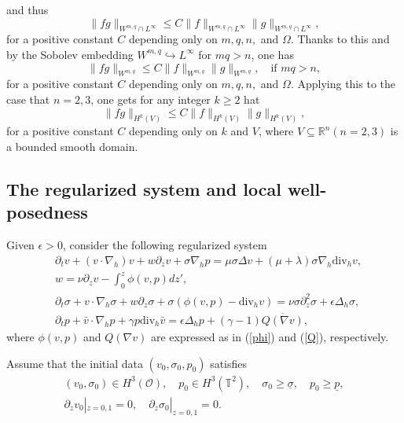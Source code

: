 \documentclass[12pt,reqno]{amsart}
\numberwithin{equation}{section}
\begin{document}
and thus
\begin{equation*}
   \|fg\|_{W^{m,q}\cap L^\infty}\leq C \|f\|_{W^{m,q}\cap L^\infty}\|g\|_{W^{m,q}\cap L^\infty},
\end{equation*}
for a positive constant $C$ depending only on $m, q, n,$ and $\Omega$. Thanks to this and by the Sobolev embedding $W^{m,q}\hookrightarrow
L^\infty$ for $mq>n$, one has
\begin{equation*}
  \|fg\|_{W^{m,q}}\leq C \|f\|_{W^{m,q}}\|g\|_{W^{m,q}},\quad\mbox{if }mq>n,
\end{equation*}
for a positive constant $C$ depending only on $m, q, n,$ and $\Omega$. Applying this to the case that $n=2,3$, one gets for any integer $k\geq2$ hat
\begin{equation}
\label{ALGHk}
  \|fg\|_{H^k(V)}\leq C\|f\|_{H^k(V)}\|g\|_{H^k(V)},
\end{equation}
for a positive constant $C$ depending only on $k$ and $V$, where $V\subseteq\mathbb R^n (n=2,3)$ is a bounded smooth domain.

\subsection{The regularized system and local well-posedness}
Given $\epsilon>0$, consider the following regularized system
\begin{eqnarray}
  &\partial_tv+(v\cdot\nabla_h)v+w\partial_zv+\sigma\nabla_hp=\mu\sigma\Delta v+(\mu+\lambda)\sigma\nabla_h\text{div}_hv,\label{EQv}\\
  &w=\nu\partial_zv-\int_0^z\phi(v,p)dz',\label{EQw}\\
  &\partial_t\sigma+v\cdot\nabla_h\sigma+w\partial_z\sigma+\sigma(\phi(v,p)-\text{div}_hv)=\nu\sigma\partial_z^2\sigma+\epsilon\Delta_h\sigma,
  \label{EQs}\\
  &\partial_tp+\bar v\cdot\nabla_hp+\gamma p\text{div}_h\bar v=\epsilon\Delta_hp+(\gamma-1)\overline{Q(\nabla v)}, \label{EQp}
\end{eqnarray}
where $\phi(v,p)$ and $Q(\nabla v)$ are expressed as in (\ref{phi}) and (\ref{Q}), respectively.

Assume that the initial data $(v_{0}, \sigma_{0}, p_{0})$ satisfies
\begin{eqnarray}
    (v_{0}, \sigma_{0})\in H^3(\mathcal O),\quad p_{0}\in H^3(\mathbb T^2),\quad
    \sigma_{0}\geq\underline\sigma, \quad p_{0}\geq\underline p,\label{ASSUMIC1}\\
    \partial_zv_{0}|_{z=0,1}=0,\quad \partial_z\sigma_{0}|_{z=0,1}=0.\label{ASSUMIC2}
\end{eqnarray}
\end{document}
